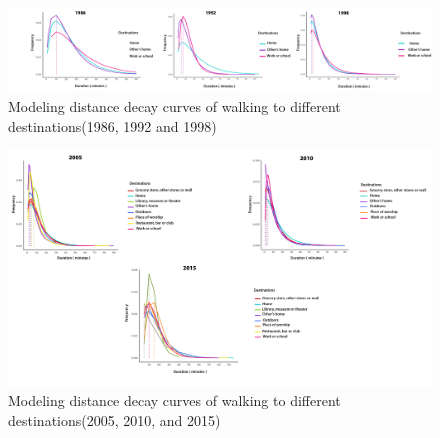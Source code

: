\documentclass[12pt,twoside]{reedthesis}
\begin{document}
\newpage
\thispagestyle{empty}
\begin{landscape}
\begin{figure}

{\centering \includegraphics[width=1\linewidth]{imp_walking_1} 

}

\caption{Modeling distance decay curves of walking to different destinations(1986, 1992 and 1998)}\label{fig:imp-w1}
\end{figure}
\begin{figure}

{\centering \includegraphics[width=0.9\linewidth]{imped_walking_2} 

}

\caption{Modeling distance decay curves of walking to different destinations(2005, 2010, and 2015)}\label{fig:imp-w2}
\end{figure}
\end{landscape}
\clearpage
\end{document}
